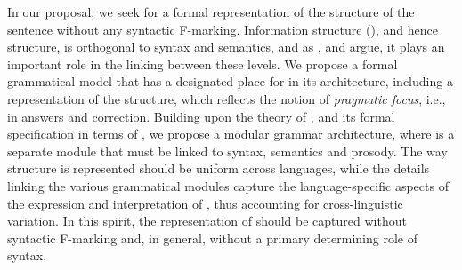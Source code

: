 \documentclass[output=paper,colorlinks,citecolor=brown]{langscibook}
\begin{document}
In our proposal, we seek for a formal representation of the  structure of the sentence without any syntactic F-marking. Information structure (), and hence  structure, is orthogonal to syntax and semantics, and as \citet{vanvalin:05}, \citet{lvv:23} and \citet{bentley:23} argue, it plays an important role in the linking between these levels. We propose a formal grammatical model that has a designated place for  in its architecture, including a representation of the  structure, which reflects the notion of \textit{pragmatic focus}, i.e.,  in answers and correction. Building upon the theory of  \citep[;][]{vvlp:97,vanvalin:05,vanvalin:23:princ}, and its formal specification in terms of  \citep[;][]{kallm:etal:13,kallm:16}, we propose a modular grammar architecture, where  is a separate module that must be linked to syntax, semantics and prosody. The way  structure is represented should be uniform across languages, while the details linking the various grammatical modules capture the language-specific aspects of the expression and interpretation of , thus accounting for cross-linguistic variation. In this spirit, the representation of  should be captured without syntactic F-marking and, in general, without a primary determining role of syntax.
\end{document}
